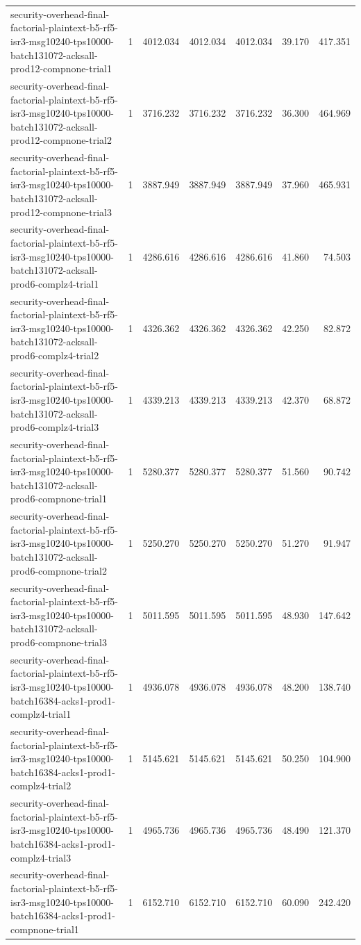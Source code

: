 \begin{tabular}{lrrrrrr}
security-overhead-final-factorial-plaintext-b5-rf5-isr3-msg10240-tps10000-batch131072-acksall-prod12-compnone-trial1 & 1 & 4012.034 & 4012.034 & 4012.034 & 39.170 & 417.351 \\
security-overhead-final-factorial-plaintext-b5-rf5-isr3-msg10240-tps10000-batch131072-acksall-prod12-compnone-trial2 & 1 & 3716.232 & 3716.232 & 3716.232 & 36.300 & 464.969 \\
security-overhead-final-factorial-plaintext-b5-rf5-isr3-msg10240-tps10000-batch131072-acksall-prod12-compnone-trial3 & 1 & 3887.949 & 3887.949 & 3887.949 & 37.960 & 465.931 \\
security-overhead-final-factorial-plaintext-b5-rf5-isr3-msg10240-tps10000-batch131072-acksall-prod6-complz4-trial1 & 1 & 4286.616 & 4286.616 & 4286.616 & 41.860 & 74.503 \\
security-overhead-final-factorial-plaintext-b5-rf5-isr3-msg10240-tps10000-batch131072-acksall-prod6-complz4-trial2 & 1 & 4326.362 & 4326.362 & 4326.362 & 42.250 & 82.872 \\
security-overhead-final-factorial-plaintext-b5-rf5-isr3-msg10240-tps10000-batch131072-acksall-prod6-complz4-trial3 & 1 & 4339.213 & 4339.213 & 4339.213 & 42.370 & 68.872 \\
security-overhead-final-factorial-plaintext-b5-rf5-isr3-msg10240-tps10000-batch131072-acksall-prod6-compnone-trial1 & 1 & 5280.377 & 5280.377 & 5280.377 & 51.560 & 90.742 \\
security-overhead-final-factorial-plaintext-b5-rf5-isr3-msg10240-tps10000-batch131072-acksall-prod6-compnone-trial2 & 1 & 5250.270 & 5250.270 & 5250.270 & 51.270 & 91.947 \\
security-overhead-final-factorial-plaintext-b5-rf5-isr3-msg10240-tps10000-batch131072-acksall-prod6-compnone-trial3 & 1 & 5011.595 & 5011.595 & 5011.595 & 48.930 & 147.642 \\
security-overhead-final-factorial-plaintext-b5-rf5-isr3-msg10240-tps10000-batch16384-acks1-prod1-complz4-trial1 & 1 & 4936.078 & 4936.078 & 4936.078 & 48.200 & 138.740 \\
security-overhead-final-factorial-plaintext-b5-rf5-isr3-msg10240-tps10000-batch16384-acks1-prod1-complz4-trial2 & 1 & 5145.621 & 5145.621 & 5145.621 & 50.250 & 104.900 \\
security-overhead-final-factorial-plaintext-b5-rf5-isr3-msg10240-tps10000-batch16384-acks1-prod1-complz4-trial3 & 1 & 4965.736 & 4965.736 & 4965.736 & 48.490 & 121.370 \\
security-overhead-final-factorial-plaintext-b5-rf5-isr3-msg10240-tps10000-batch16384-acks1-prod1-compnone-trial1 & 1 & 6152.710 & 6152.710 & 6152.710 & 60.090 & 242.420 \\

\end{tabular}
